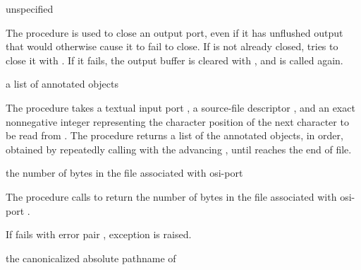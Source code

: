 \begin{procedure}
\end{procedure}
\returns{} unspecified

The  procedure is used to close an
output port, even if it has unflushed output that would otherwise
cause it to fail to close.  If  is not already closed,
 tries to close it with
. If it fails, the output buffer is
cleared with , and
 is called again.

\begin{procedure}
\end{procedure}
\returns{} a list of annotated objects

The  procedure takes a textual input
port , a source-file descriptor , and an exact
nonnegative integer  representing the character position of
the next character to be read from . The procedure returns a
list of the annotated objects, in order, obtained by repeatedly
calling  with the advancing ,
until  reaches the end of file.

\begin{procedure}
\end{procedure}
\returns{} the number of bytes in the file associated with osi-port 

The  procedure calls 
to return the number of bytes in the file associated with osi-port
.

If  fails with error pair , exception  is raised.

\begin{procedure}
\end{procedure}
\returns{} the canonicalized absolute pathname of 

